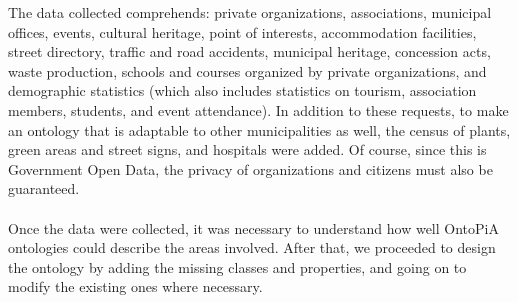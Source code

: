 The data collected comprehends: private organizations, associations, municipal offices, events, cultural heritage, point of interests, accommodation facilities, street directory, traffic and road accidents, municipal heritage, concession acts, waste production, schools and courses organized by private organizations, and demographic statistics (which also includes statistics on tourism, association members, students, and event attendance). In addition to these requests, to make an ontology that is adaptable to other municipalities as well, the census of plants, green areas and street signs, and hospitals were added. Of course, since this is Government Open Data, the privacy of organizations and citizens must also be guaranteed.

\paragraph*{}
Once the data were collected, it was necessary to understand how well OntoPiA ontologies could describe the areas involved. After that, we proceeded to design the ontology by adding the missing classes and properties, and going on to modify the existing ones where necessary.